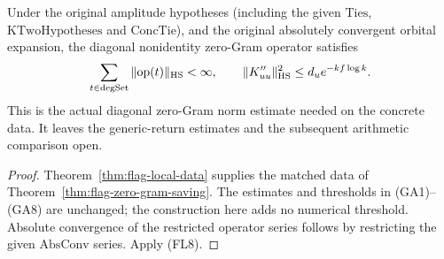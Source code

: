 \begin{corollary}
\label{cor:flag-zero-gram-concrete}
Under the original amplitude hypotheses (including the given
\(\mathrm{Ties}\), \(\mathrm{KTwoHypotheses}\) and
\(\mathrm{ConcTie}\)), and the original absolutely convergent
orbital expansion, the diagonal nonidentity zero-Gram
operator satisfies
\[
 \sum_{t\in\mathrm{degSet}}\|\mathrm{op}(t)\|_{\rm HS}<\infty,
 \qquad
 \|K''_{uu}\|_{\rm HS}^2\le d_u e^{-kf\log k}.
\]
This is the actual diagonal zero-Gram norm estimate needed
on the concrete data. It leaves the generic-return estimates
and the subsequent arithmetic comparison open.
\end{corollary}
\begin{proof}
Theorem~\ref{thm:flag-local-data} supplies the matched data of
Theorem~\ref{thm:flag-zero-gram-saving}. The estimates and
thresholds in (GA1)--(GA8) are unchanged; the construction
here adds no numerical threshold. Absolute convergence of
the restricted operator series follows by restricting the
given \(\mathrm{AbsConv}\) series. Apply (FL8).
\end{proof}
